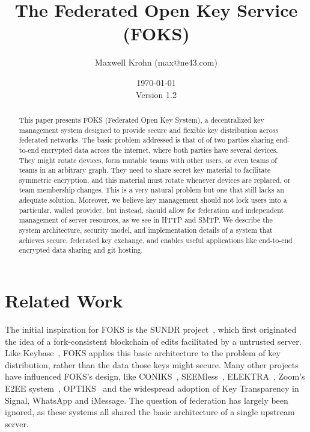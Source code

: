 \documentclass[11pt]{article}
\title{The Federated Open Key Service (FOKS)}
\author{Maxwell Krohn (max@ne43.com)}
\date{\today\\Version 1.2}
\begin{document}
\newcommand{\yubi}{Yubikey}
\newcommand{\Yubi}{Yubikey}
\newcommand{\yubis}{Yubikeys}
\newcommand{\Yubis}{Yubikeys}

\maketitle

\begin{abstract}

This paper presents FOKS (Federated Open Key System), a
decentralized key management system designed to provide secure and flexible key
distribution across federated networks. The basic problem addressed is that of
of two parties sharing end-to-end encrypted data across the internet, where both
parties have several devices. They might rotate devices, form mutable teams with
other users, or even teams of teams in an arbitrary graph. They need to share
secret key material to facilitate symmetric encryption, and this material must
rotate whenever devices are replaced, or team membership changes.  This is a
very natural problem but one that still lacks an adequate solution.  Moreover, we
believe key management should not lock users into a particular, walled provider,
but instead, should allow for federation and independent management of server
resources, as we see in HTTP and SMTP.  We describe the system architecture,
security model, and implementation details of a system that achieves secure,
federated key exchange, and enables useful applications like end-to-end
encrypted data sharing and git hosting.

\end{abstract}











\section{Related Work}

The initial inspiration for FOKS is the SUNDR project~\cite{sundr}, which first
originated the idea of a fork-consistent blockchain of edits facilitated by a
untrusted server.  Like Keybase~\cite{keybase}, FOKS applies this basic
architecture to the problem of key distribution, rather than the data those keys
might secure. Many other projects have influenced FOKS's design, like
CONIKS~\cite{melara2015coniks}, SEEMless~\cite{chase2019seemless}, 
ELEKTRA~\cite{cryptoeprint:2024/107}, Zoom's E2EE system~\cite{zoom_e2e_v4}, 
OPTIKS~\cite{cryptoeprint:2023/1515} and the widespread adoption of Key
Transparency in Signal, WhatsApp and iMessage. The question of federation has
largely been ignored, as these systems all shared the basic architecture of a
single upstream server. 
\end{document}
